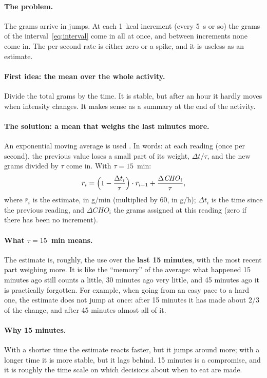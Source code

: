 \documentclass[10pt,a4paper]{article}
\newcommand{\cho}{\ensuremath{\mathit{CHO}}}               %
\begin{document}
\paragraph{The problem.} The grams arrive in jumps. At each 1~kcal increment (every 5~s or
so) the grams of the interval~\eqref{eq:interval} come in all at once, and between
increments none come in. The per-second rate is either zero or a spike, and it is useless as
an estimate.

\paragraph{First idea: the mean over the whole activity.} Divide the total grams by the
time. It is stable, but after an hour it hardly moves when intensity changes. It makes sense
as a summary at the end of the activity.

\paragraph{The solution: a mean that weighs the last minutes more.} An exponential moving
average is used \citep{hunter1986}. In words: at each reading (once per second), the
previous value loses a small part of its weight, $\Delta t/\tau$, and the new grams divided
by $\tau$ come in. With $\tau=15$~min:
\begin{equation}
  \bar r_i=\Bigl(1-\frac{\Delta t_i}{\tau}\Bigr)\cdot\bar r_{i-1}+\frac{\Delta\cho_i}{\tau},
  \label{eq:ema}
\end{equation}
where $\bar r_i$ is the estimate, in g/min (multiplied by 60, in g/h); $\Delta t_i$ is the
time since the previous reading, and $\Delta\cho_i$ the grams assigned at this reading
(zero if there has been no increment).

\paragraph{What $\tau=15$~min means.} The estimate is, roughly, the use over the
\textbf{last 15 minutes}, with the most recent part weighing more. It is like the
``memory'' of the average: what happened 15 minutes ago still counts a little, 30 minutes
ago very little, and 45 minutes ago it is practically forgotten. For example, when going
from an easy pace to a hard one, the estimate does not jump at once: after 15 minutes it has
made about 2/3 of the change, and after 45 minutes almost all of it.

\paragraph{Why 15 minutes.} With a shorter time the estimate reacts faster, but it jumps
around more; with a longer time it is more stable, but it lags behind. 15 minutes is a
compromise, and it is roughly the time scale on which decisions about when to eat are made.
\end{document}
